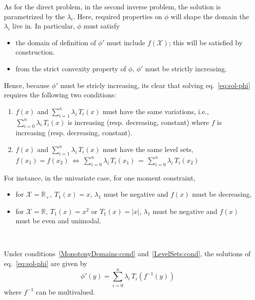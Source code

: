 \documentclass[entropy,article,submit,moreauthors,pdftex]{Definitions/mdpi}
\def\Rset{\mathbb{R}}%
\def\X{\mathcal{X}}%
\begin{document}
As  for the  direct problem,  in  the second  inverse problem,  the solution  is
parametrized by the $\lambda_i$. Here,  required properties on $\phi$ will shape
the domain the $\lambda_i$ live in. In particular, $\phi$ must satisfy
%
\begin{itemize}
\item the  domain of definition  of $\phi'$ must  include $f(\X)$; this  will be
  satisfied by construction.
%
\item from  the strict convexity  property of  $\phi$, $\phi'$ must  be strictly
  increasing.
\end{itemize}
%
Hence,  because $\phi'$  must  be  stricly increasing,  its  clear that  solving
eq.~\eqref{eq:sol-phi} requires the following two conditions:
%
\begin{enumerate}[label=(C\arabic*)]
\item\label{MonotonyDomains:cond}   $f(x)$   and   $\displaystyle   \sum_{i=1}^n
  \lambda_i  \, T_i(x)$  must  have the  same  variations, i.e.,  $\displaystyle
  \sum_{i=0}^n \lambda_i \, T_i(x)$  is increasing (resp.  decreasing, constant)
  where $f$ is increasing (resp. decreasing, constant).
%
\item\label{LevelSets:cond} $f(x)$ and  $\displaystyle \sum_{i=1}^n \lambda_i \,
  T_i(x)$ must have the same level sets,\newline $ \displaystyle f(x_1) = f(x_2)
  \: \Leftrightarrow \: \sum_{i=0}^n \lambda_i  \, T_i(x_1) \, = \, \sum_{i=0}^n
  \lambda_i \, T_i(x_2)$
\end{enumerate}
%
For instance, in the univariate case, for one moment constraint,
%
\begin{itemize}
\item for $\X = \Rset_+, \: T_1(x) = x$, $\lambda_1$ must be negative and $f(x)$
  must be decreasing,
%
\item for $\X =  \Rset, \: T_1(x) = x^2$ or $T_1(x) =  |x|$, $\lambda_1$ must be
  negative and $f(x)$ must be even and unimodal.
\end{itemize}

\

Under   conditions~\ref{MonotonyDomains:cond}    and~\ref{LevelSets:cond},   the
solutions of eq.~\eqref{eq:sol-phi} are given by
%
\begin{equation}\label{eq:derivative-phi}
\phi'(y) = \sum_{i=0}^n \lambda_i \, T_i\!\left(f^{-1}(y)\right)
\end{equation}
%
where $f^{-1}$ can be multivalued.

\
\end{document}

